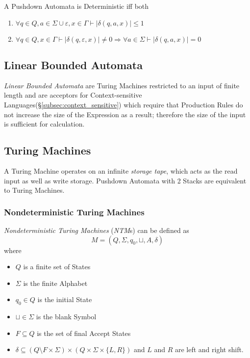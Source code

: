 \documentclass{article}
\begin{document}
A Pushdown Automata is Deterministic iff both
\begin{enumerate}
\item $\forall q \in Q, a \in \Sigma \cup {\varepsilon}, x \in
  \Gamma \vdash |\delta(q,a,x)| \leq 1$
\item $\forall q \in Q, x \in \Gamma \vdash |\delta(q,\varepsilon,x)|
  \neq 0 \Rightarrow \forall a \in \Sigma \vdash |\delta(q,a,x)|=0$
\end{enumerate}

\subsection{Linear Bounded Automata} \label{subsec:linear_bounded_automata}

\emph{Linear Bounded Automata} are Turing Machines restricted to an
input of finite length and are acceptors for Context-sensitive
Languages(\S\ref{subsec:context_sensitive}) which require that
Production Rules do not increase the size of the Expression as a
result; therefore the size of the input is sufficient for calculation.

\subsection{Turing Machines}\label{subsec:turing_machine}

A Turing Machine operates on an infinite \emph{storage tape}, which
acts as the read input as well as write storage. Pushdown Automata
with 2 Stacks are equivalent to Turing Machines.

\subsubsection{Nondeterministic Turing Machines}
\emph{Nondeterministic Turing Machines} (\emph{NTM}s) can be defined
as
    \[
        M = (Q, \Sigma, q_0, \sqcup, A, \delta)
    \]
where
\begin{itemize}
\item $Q$ is a finite set of States
\item $\Sigma$ is the finite Alphabet
\item $q_0 \in Q$ is the initial State
\item $\sqcup \in \Sigma$ is the blank Symbol
\item $F \subseteq Q$ is the set of final Accept States
\item $\delta \subseteq (Q \setminus F \times \Sigma) \times (Q \times
  \Sigma \times \{L,R\})$ and $L$ and $R$ are left and right shift.
\end{itemize}
\end{document}
